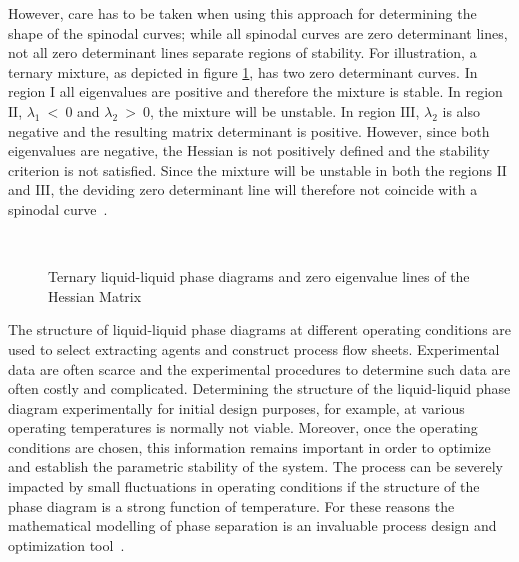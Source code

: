 However, care has to be taken when using this approach for determining the shape of the spinodal curves; while all spinodal curves are zero determinant lines, not all zero determinant lines separate regions of stability. For illustration, a ternary mixture, as depicted in figure \ref{ZeroEigenvalueLinesDrawing}, has two zero determinant curves. In region $\mathrm{I}$ all eigenvalues are positive and therefore the mixture is stable. In region $\mathrm{II}$, $\lambda_{1}~<~0$ and $\lambda_{2}~>~0$, the mixture will be unstable. In region $\mathrm{III}$, $\lambda_{2}$ is also negative and the resulting matrix determinant is positive. However, since both eigenvalues are negative, the Hessian is not positively defined and the stability criterion is not satisfied. Since the mixture will be unstable in both the regions $\mathrm{II}$ and $\mathrm{III}$, the deviding zero determinant line will therefore not coincide with a spinodal curve~\cite{HessianPhaseEquilibriumCriterion}.\\

\begin{figure}[t]
\begin{center}
\resizebox{0.7\textwidth}{!}{}\\
\end{center}
\caption{Ternary liquid-liquid phase diagrams and zero eigenvalue lines of the Hessian Matrix} \label{ZeroEigenvalueLinesDrawing}
\end{figure}	

The structure of liquid-liquid phase diagrams at different operating conditions are used to select extracting agents and construct process flow sheets. Experimental data are often scarce and the experimental procedures to determine such data are often costly and complicated. Determining the structure of the liquid-liquid phase diagram experimentally for initial design purposes, for example, at various operating temperatures is normally not viable. Moreover, once the operating conditions are chosen, this information remains important in order to optimize and establish the parametric stability of the system. The process can be severely impacted by small fluctuations in operating conditions if the structure of the phase diagram is a strong function of temperature. For these reasons the mathematical modelling of phase separation is an invaluable process design and optimization tool~\cite{HessianPhaseEquilibriumCriterion, HessianPhaseDiagramConstruction}.\\

